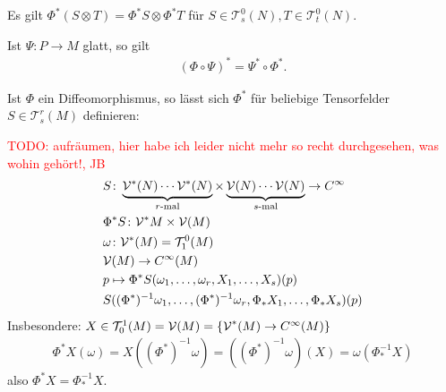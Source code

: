 Es gilt $\Phi^{*}(S \otimes T) = \Phi^{*}S \otimes \Phi^{*}T$ für $S \in \mathcal T_s^0(N), T \in \mathcal T_t^0(N)$.

Ist $\Psi \colon P \to M$ glatt, so gilt
\begin{align*}
  (\Phi \circ \Psi)^{*} = \Psi^{*} \circ \Phi^{*}.
\end{align*}

Ist $\Phi$ ein Diffeomorphismus, so lässt sich $\Phi^{*}$ für beliebige Tensorfelder $S \in \mathcal T_s^r(M)$ definieren:

\textcolor{red}{TODO: aufräumen, hier habe ich leider nicht mehr so recht durchgesehen, was wohin gehört!, JB}
\begin{align*}
& S \colon \underbrace{\mathcal V^{*}(N) \cdots \mathcal V^{*}(N)}_{r\text{-mal}} \times \underbrace{ \mathcal V(N) \cdots\mathcal V(N)}_{s\text{-mal}} \to C^{\infty}\\
& \Phi^{*}S \colon \mathcal V^{*}M \times \mathcal V(M)\\
& \omega \colon \mathcal V^{*}(M) = \mathcal T_1^0(M)\\
& \mathcal V(M) \to C^{\infty}(M)\\
& p \mapsto\Phi^{*}S (\omega_1,\ldots,\omega_r,X_1,\ldots,X_s)(p)\\
& S((\Phi^{*})^{-1}\omega_1, \ldots, (\Phi^{*})^{-1}\omega_{r}, \Phi_{*}X_1,\ldots,\Phi_{*}X_s)(p)
\end{align*}
Insbesondere: $X \in \mathcal T_0^1(M) = \mathcal V(M) = \{\operatorname{\mathcal{V}}^*(M) \to C^{\infty}(M)\}$
\begin{align*}
  \Phi^{*}X(\omega) = X((\Phi^{*})^{-1}\omega) = ((\Phi^{*})^{-1}\omega)(X) = \omega(\Phi_{*}^{-1}X)
\end{align*}
also $\Phi^{*}X = \Phi_{*}^{-1}X$.

